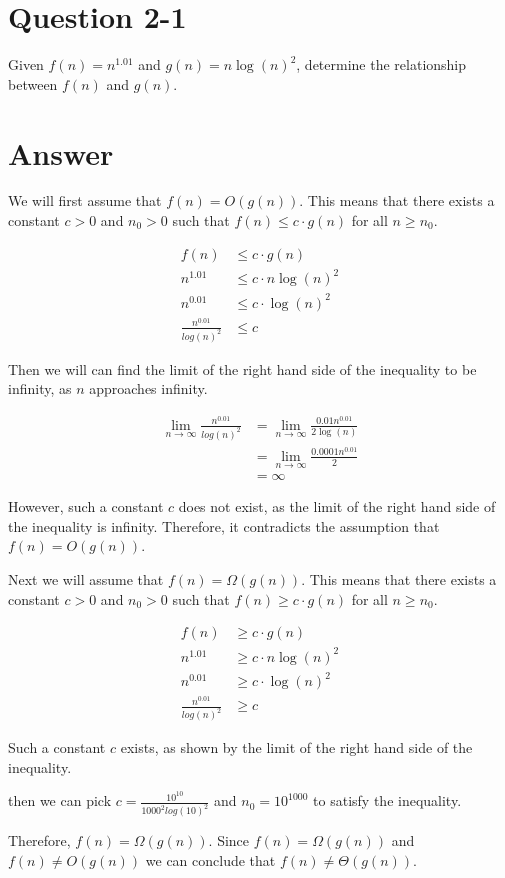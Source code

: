 \documentclass{article}
\begin{document}
\section{Question 2-1}
Given $f(n) = n^{1.01}$ and $g(n) = n\log(n)^2$, determine the relationship between $f(n)$ and $g(n)$.

\section{Answer}
We will first assume that $f(n) = O(g(n))$. This means that there exists a constant $c > 0$ and $n_0 > 0$ such that $f(n) \leq c \cdot g(n)$ for all $n \geq n_0$.

\begin{align*}
f(n) &\leq c \cdot g(n) \\
n^{1.01} &\leq c \cdot n\log(n)^2 \\
n^{0.01} &\leq c \cdot \log(n)^2 \\
\frac{n^{0.01}}{log(n)^2} &\leq c
\end{align*}

Then we will can find the limit of the right hand side of the inequality to be infinity, as $n$ approaches infinity.

\begin{align*}
\lim_{n \to \infty} \frac{n^{0.01}}{log(n)^2} &= \lim_{n \to \infty} \frac{0.01n^{0.01}}{2\log(n)} \tag{L'Hopital}\\
&= \lim_{n \to \infty} \frac{0.0001n^{0.01}}{2} \\
&= \infty
\end{align*}

However, such a constant $c$ does not exist, as the limit of the right hand side of the inequality is infinity. Therefore, it contradicts the assumption that $f(n) = O(g(n))$.

Next we will assume that $f(n) = \Omega(g(n))$. This means that there exists a constant $c > 0$ and $n_0 > 0$ such that $f(n) \geq c \cdot g(n)$ for all $n \geq n_0$.

\begin{align*}
f(n) &\geq c \cdot g(n) \\
n^{1.01} &\geq c \cdot n\log(n)^2 \\
n^{0.01} &\geq c \cdot \log(n)^2 \\
\frac{n^{0.01}}{log(n)^2} &\geq c
\end{align*}

Such a constant $c$ exists, as shown by the limit of the right hand side of the inequality.

then we can pick $c = \frac{10^{10}}{1000^2log(10)^2}$ and $n_0 = 10^{1000}$ to satisfy the inequality.

Therefore, $f(n) = \Omega(g(n))$. Since $f(n) = \Omega(g(n))$ and $f(n) \ne O(g(n))$ we can conclude that $f(n) \ne \Theta(g(n))$.
\end{document}
